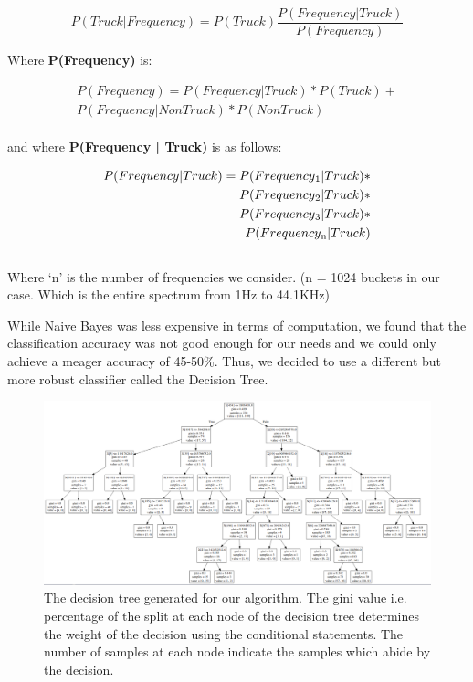 \documentclass[sigconf, authorversion=false,  screen=true]{acmart}
\begin{document}
	\begin{equation}
	\label{eq:bayes}
	P(Truck|Frequency) = P(Truck) \frac{P(Frequency | Truck)}{P(Frequency)}
	\end{equation}
	
	Where \textbf{P(Frequency)} is:
	
	\begin{equation}
	\begin{aligned}
	\label{eq:bayes2}
	P(Frequency) = P(Frequency | Truck) * P(Truck) +\\ P(Frequency | Non Truck) * P(Non Truck)
	\end{aligned}
	\end{equation}\\
	
	and where \textbf{P(Frequency | Truck)} is as follows:
	
	\begin{equation}
	\begin{aligned}
	\label{eq:bayes3}
	P(Frequency | Truck) = P(Frequency\textsubscript{1} | Truck) *\\ P(Frequency\textsubscript{2} | Truck) *\\ P(Frequency\textsubscript{3} | Truck) *\\ P(Frequency\textsubscript{n} | Truck)
	\end{aligned}
	\end{equation}\\
	
	Where ‘n’ is the number of frequencies we consider. (n = 1024 buckets in our case. Which is the entire spectrum from 1Hz to 44.1KHz)
	
	While Naive Bayes was less expensive in terms of computation, we found that the classification accuracy was not good enough for our needs and we could only achieve a meager accuracy of 45-50\%. Thus, we decided to use a different but more robust classifier called the Decision Tree.
	
	\begin{figure}
		\includegraphics[width=\linewidth]{decision_tree}
		\caption{The decision tree generated for our algorithm. The gini value i.e. percentage of the split at each node of the decision tree determines the weight of the decision using the conditional statements. The number of samples at each node indicate the samples which abide by the decision. }
		\label{fig:dec_tree}
	\end{figure}
\end{document}
